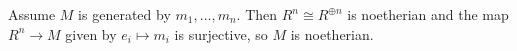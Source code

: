 Assume $M$ is generated by $m_1, \ldots, m_n$. Then $R^n \cong R^{\oplus n}$ is
noetherian and the map $R^n \to M$ given by $e_i \mapsto m_i$ is surjective,
so $M$ is noetherian.
